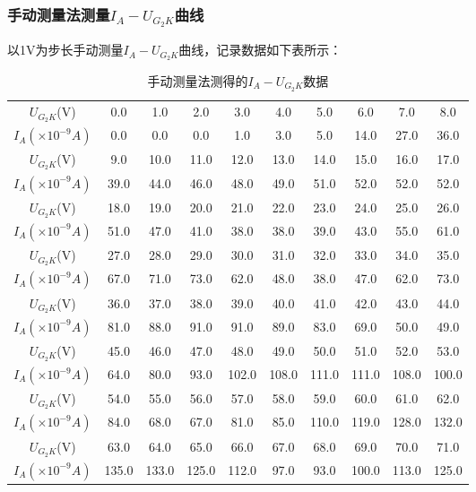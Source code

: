 \documentclass[]{../template/Report}%
\begin{document}
\begin{fullreportonly}
\subsubsection{手动测量法测量$I_A-U_{G_2K}$曲线}
以1V为步长手动测量$I_A-U_{G_2K}$曲线，记录数据如下表所示：
\begin{longtable}{cccccccccc}
    \caption{手动测量法测得的$I_A-U_{G_2K}$数据} \label{tab:manual_measure} \\
    \hline
    $U_{G_2K}$(V) & 0.0 & 1.0 & 2.0 & 3.0 & 4.0 & 5.0 & 6.0 & 7.0 & 8.0 \\
    $I_A(\times 10^{-9} A)$ & 0.0 & 0.0 & 0.0 & 1.0 & 3.0 & 5.0 & 14.0 & 27.0 & 36.0 \\
    \hline
    $U_{G_2K}$(V) & 9.0 & 10.0 & 11.0 & 12.0 & 13.0 & 14.0 & 15.0 & 16.0 & 17.0 \\
    $I_A(\times 10^{-9} A)$ & 39.0 & 44.0 & 46.0 & 48.0 & 49.0 & 51.0 & 52.0 & 52.0 & 52.0 \\
    \hline
    $U_{G_2K}$(V) & 18.0 & 19.0 & 20.0 & 21.0 & 22.0 & 23.0 & 24.0 & 25.0 & 26.0 \\
    $I_A(\times 10^{-9} A)$ & 51.0 & 47.0 & 41.0 & 38.0 & 38.0 & 39.0 & 43.0 & 55.0 & 61.0 \\
    \hline
    $U_{G_2K}$(V) & 27.0 & 28.0 & 29.0 & 30.0 & 31.0 & 32.0 & 33.0 & 34.0 & 35.0 \\
    $I_A(\times 10^{-9} A)$ & 67.0 & 71.0 & 73.0 & 62.0 & 48.0 & 38.0 & 47.0 & 62.0 & 73.0 \\
    \hline
    $U_{G_2K}$(V) & 36.0 & 37.0 & 38.0 & 39.0 & 40.0 & 41.0 & 42.0 & 43.0 & 44.0 \\
    $I_A(\times 10^{-9} A)$ & 81.0 & 88.0 & 91.0 & 91.0 & 89.0 & 83.0 & 69.0 & 50.0 & 49.0 \\
    \hline
    $U_{G_2K}$(V) & 45.0 & 46.0 & 47.0 & 48.0 & 49.0 & 50.0 & 51.0 & 52.0 & 53.0 \\
    $I_A(\times 10^{-9} A)$ & 64.0 & 80.0 & 93.0 & 102.0 & 108.0 & 111.0 & 111.0 & 108.0 & 100.0 \\
    \hline
    $U_{G_2K}$(V) & 54.0 & 55.0 & 56.0 & 57.0 & 58.0 & 59.0 & 60.0 & 61.0 & 62.0 \\
    $I_A(\times 10^{-9} A)$ & 84.0 & 68.0 & 67.0 & 81.0 & 85.0 & 110.0 & 119.0 & 128.0 & 132.0 \\
    \hline
    $U_{G_2K}$(V) & 63.0 & 64.0 & 65.0 & 66.0 & 67.0 & 68.0 & 69.0 & 70.0 & 71.0 \\
    $I_A(\times 10^{-9} A)$ & 135.0 & 133.0 & 125.0 & 112.0 & 97.0 & 93.0 & 100.0 & 113.0 & 125.0 \\

\end{longtable}
\end{fullreportonly}
\end{document}
